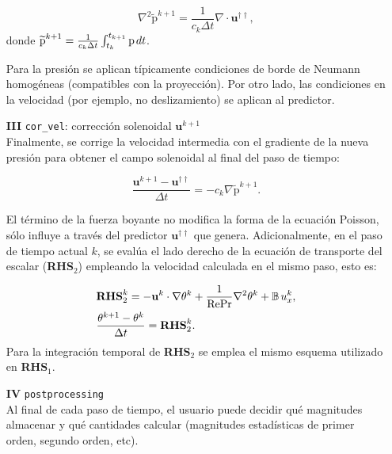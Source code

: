 \begin{enumerate}
\begin{equation}
\nabla^2 \widetilde{\text{p}}^{k+1} = \frac{1}{c_k \Delta t} \nabla \cdot \mathbf{u}^{\dagger \dagger},
\end{equation}
donde $\widetilde{\text{p}}^{k+1}= \frac{1}{c_k \Delta t} \int^{t_{k+1}}_{t_k} \text{p} \hspace{0.5mm} dt$. 

Para la presión se aplican típicamente condiciones de borde de Neumann homogéneas (compatibles con la proyección). Por otro lado, las condiciones en la velocidad (por ejemplo, no deslizamiento) se aplican al predictor.

	\item[\textbf{III}]  \texttt{cor\_vel}: corrección solenoidal $\mathbf{u}^{k+1}$ \\
	Finalmente, se corrige la velocidad intermedia con el gradiente de la nueva presión para obtener
el campo solenoidal al final del paso de tiempo:

\begin{equation}
\frac{ \mathbf{u}^{k+1} - \mathbf{u}^{\dagger \dagger} }{\Delta t} = - c_k \nabla \widetilde{\text{p}}^{k+1} \text{.}
\label{eq:correccion}
\end{equation}

El término de la fuerza boyante no modifica la forma de la ecuación Poisson, sólo influye a través del predictor $\mathbf{u}^{\dagger \dagger}$ que genera. Adicionalmente, en el paso de tiempo actual $k$, se evalúa el lado derecho de la ecuación de transporte del escalar (\textbf{RHS}$_2$) empleando la velocidad calculada en el mismo paso, esto es:

\begin{equation}
\begin{aligned}
& \textbf{RHS}_2^k = - \mathbf{u}^{k} \cdot \nabla \theta^k + \frac{1}{\text{Re} \text{Pr}} \nabla^2 \theta^k + \mathbb{B} \hspace{0.5mm} u_x^{k}, \\
& \frac{\theta^{k+1} - \theta^{k}}{\Delta t} = \textbf{RHS}_2^k \text{.}
\end{aligned}
\end{equation}
Para la integración temporal de \textbf{RHS}$_2$ se emplea el mismo esquema utilizado en \textbf{RHS}$_1$.

\item[\textbf{IV}] \texttt{postprocessing} \\
Al final de cada paso de tiempo, el usuario puede decidir qué magnitudes almacenar y qué cantidades calcular (magnitudes estadísticas de primer orden, segundo orden, etc).

\end{enumerate}

